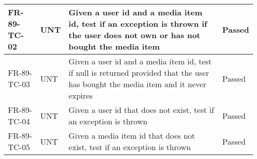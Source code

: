 \documentclass[../report.tex]{subfiles}
\begin{document}
\begin{longtable}{|L{2.1cm}|L{0.8cm}|L{9cm}|L{1.2cm}|}
FR-89-TC-02&UNT&Given a user id and a media item id, test if an exception is thrown if the user does not own or has not bought the media item&Passed  \\ \hline
FR-89-TC-03&UNT&Given a user id and a media item id, test if null is returned provided that the user has bought the media item and it never expires&Passed  \\ \hline
FR-89-TC-04&UNT&Given a user id that does not exist, test if an exception is thrown&Passed  \\ \hline
FR-89-TC-05&UNT&Given a media item id that does not exist, test if an exception is thrown&Passed  \\ \hline

\end{longtable}

\label{testmatrix}
\end{document}
